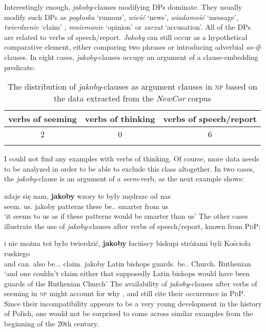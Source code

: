 \documentclass[output=paper
,modfonts
,nonflat]{langsci/langscibook}
\begin{document}
\noindent  Interestingly enough, \emph{jakoby}-clauses modifying DPs dominate. They usually \linebreak modify such DPs as \emph{pogłoska} `rumour', \emph{wieść} `news', \emph{wiadomość} `message', \linebreak \emph{twierdzenie} `claim' , \emph{mniemanie} `opinion' or \emph{zarzut} `accusation'. All of the DPs are related to verbs of speech\slash report. \emph{Jakoby} can still occur as a hypothetical comparative element, either comparing two phrases or introducing adverbial \emph{as-if}-clauses. In eight cases, \emph{jakoby}-clauses occupy an argument of a clause-embedding predicate:

 \begin{table}[h]  \begin{tabular}{ccc}
\lsptoprule
verbs of seeming & verbs of thinking & verbs of speech\slash report \\
\midrule
2 & 0 & 6  \\
\lspbottomrule
\end{tabular}
\caption{The distribution of \emph{jakoby}-clauses as argument clauses in \textsc{np} based on the data extracted from the \emph{NewCor} corpus} \label{staropolski_nowopolski_argument}
\end{table}

\noindent  I could not find any examples with verbs of thinking. Of course, more data needs to be analyzed in order to be able to exclude this class altogether. In two cases, the \emph{jakoby}-clause is an argument of a \emph{seem}-verb, as the next example shows:

\ea \gll zdaje się nam, \textbf{jakoby} wzory te były mędrsze od nas \\
		seem.{\thirdperson}{\sg} {} us.{\dat} jakoby	patterns these be.{\lptcp}.{\nvir} smarter from us \\
\glt	`it seems to us as if these patterns would be smarter than us' 
\z
The other cases illustrate the use of \emph{jakoby}-clauses after verbs of speech\slash report, known from \textsc{PdP}:

\ea \gll i nie można też było twierdzić, \textbf{jakoby} łacińscy biskupi stróżami byli Kościoła ruskiego \\
		and {\negation} can.{\pred} also be.{\lptcp}.{\sg}.{\n} claim.{\infv} jakoby Latin bishops guards.{\ins} be.{\lptcp}.{\vir} Church.{\gen} Ruthenian \\
\glt	`and one couldn't claim either that supposedly Latin bishops would have been guards of the Ruthenian Church' 
\z
The availability of \emph{jakoby}-clauses after verbs of seeming in \textsc{np} might account for why \textcite{ojasiewicz1992}, \textcite{Wiemer2005} and \textcite{Taborek2008} still cite their occurrence in \textsc{PdP}. Since their incompatibility appears to be a very young development in the history of Polish, one would not be surprised to come across similar examples from the beginning of the 20th century.
\end{document}
